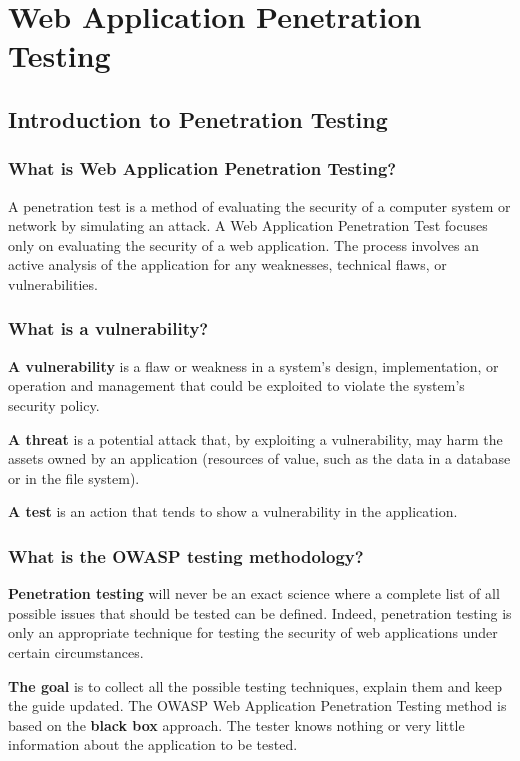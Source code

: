 \chapter{Web Application Penetration Testing}

	\section{Introduction to Penetration Testing}

	\subsection*{What is Web Application Penetration Testing?}

		A penetration test is a method of evaluating the security of a computer system or network 
		by simulating an attack. A Web Application Penetration Test focuses only on evaluating the 
		security of a web application. The process involves an active analysis of the application 
		for any weaknesses, technical flaws, or vulnerabilities. 

	\subsection*{What is a vulnerability?}
		{\bf A vulnerability} is a flaw or weakness in a system's design, implementation, or operation 
		and management that could be exploited to violate the system's security policy. 
		
		{\bf A threat} is a potential attack that, by exploiting a vulnerability, may harm the assets 
		owned by an application (resources of value, such as the data in a database or in the file system). 

		{\bf A test} is an action that tends to show a vulnerability in the application.

	\subsection*{What is the OWASP testing methodology?}
		{\bf Penetration testing} will never be an exact science where a complete list of all possible 
		issues that should be tested can be defined. Indeed, penetration testing is only an appropriate
		technique for testing the security of web applications under certain circumstances. 

		{\bf The goal} is to collect all the possible testing techniques, explain them and keep the 
		guide updated. The OWASP Web Application Penetration Testing method is based on the {\bf black box}
		approach. The tester knows nothing or very little information about the application to be tested. 

